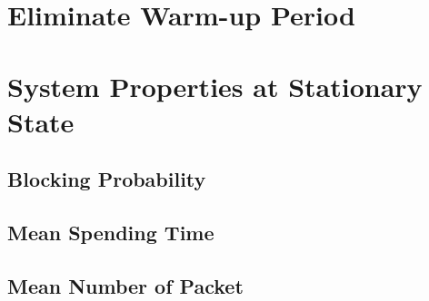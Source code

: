 \documentclass[12pt]{article}  %
\theoremstyle{definition}
\theoremstyle{remark}
\begin{document}
\section{Eliminate Warm-up Period}



\section{System Properties at Stationary State}

\subsection{Blocking Probability}


\subsection{Mean Spending Time}


\subsection{Mean Number of Packet}






\end{document}
